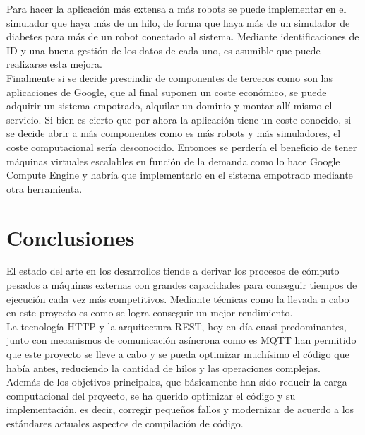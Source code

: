 \documentclass[12pt,spanish,listoffigures,listoftables]{tfgetsinf}
\begin{document}
Para hacer la aplicación más extensa a más robots se puede implementar en el simulador que haya más de un hilo, de forma que haya más de un simulador de diabetes para más de un robot conectado al sistema. Mediante identificaciones de ID y una buena gestión de los datos de cada uno, es asumible que puede realizarse esta mejora. \\

Finalmente si se decide prescindir de componentes de terceros como son las aplicaciones de Google, que al final suponen un coste económico, se puede adquirir un sistema empotrado, alquilar un dominio y montar allí mismo el servicio. Si bien es cierto que por ahora la aplicación tiene un coste conocido, si se decide abrir a más componentes como es más robots y más simuladores, el coste computacional sería desconocido. Entonces se perdería el beneficio de tener máquinas virtuales escalables en función de la demanda como lo hace Google Compute Engine y habría que implementarlo en el sistema empotrado mediante otra herramienta.

\section{Conclusiones}

El estado del arte en los desarrollos tiende a derivar los procesos de cómputo pesados a máquinas externas con grandes capacidades para conseguir tiempos de ejecución cada vez más competitivos. Mediante técnicas como la llevada a cabo en este proyecto es como se logra conseguir un mejor rendimiento. \\

La tecnología HTTP y la arquitectura REST, hoy en día cuasi predominantes, junto con mecanismos de comunicación asíncrona como es MQTT han permitido que este proyecto se lleve a cabo y se pueda optimizar muchísimo el código que había antes, reduciendo la cantidad de hilos y las operaciones complejas. \\

Además de los objetivos principales, que básicamente han sido reducir la carga computacional del proyecto, se ha querido optimizar el código y su implementación, es decir, corregir pequeños fallos y modernizar de acuerdo a los estándares actuales aspectos de compilación de código.

\end{document}
